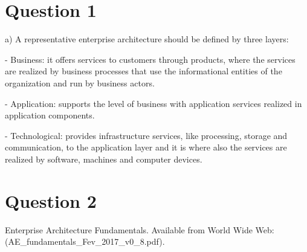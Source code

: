 \documentclass[a4paper,12pt]{texDoc}
\begin{document}
\maketitle %


\section*{Question 1}

a) A representative enterprise architecture should be defined \cite{eaFundamentals} by three layers:

- Business: it offers services to customers through products, where the services are realized by business processes that use the informational entities of the organization and run by business actors.

- Application: supports the level of business with application services realized in application components.

- Technological: provides infrastructure services, like processing, storage and communication, to the application layer and it is where also the services are realized by software, machines and computer devices.

\section*{Question 2}



\begin{thebibliography}{9}
  Enterprise Architecture Fundamentals. Available from World Wide Web: (AE\_fundamentals\_Fev\_2017\_v0\_8.pdf).
\end{thebibliography}

\end{document}
